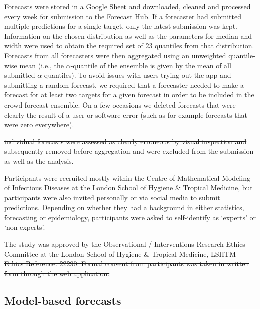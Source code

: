 \documentclass[10pt,letterpaper]{article}
\providecommand{\DIFdeltex}[1]{{\protect\color{red}\sout{#1}}}                      %
\providecommand{\DIFdelbegin}{} %
\providecommand{\DIFdelend}{} %
\providecommand{\DIFdel}[1]{\texorpdfstring{\DIFdeltex{#1}}{}} %
\newcommand{\DIFscaledelfig}{0.5}
\newlength{\DIFdelgraphicswidth} %
\newlength{\DIFdelgraphicsheight} %
\newcommand{\DIFdelincludegraphics}[2][]{%
\sbox{\DIFdelgraphicsbox}{\DIFOincludegraphics[#1]{#2}}%
\settoboxwidth{\DIFdelgraphicswidth}{\DIFdelgraphicsbox} %
\settoboxtotalheight{\DIFdelgraphicsheight}{\DIFdelgraphicsbox} %
\scalebox{\DIFscaledelfig}{%
\parbox[b]{\DIFdelgraphicswidth}{\usebox{\DIFdelgraphicsbox}\\[-\baselineskip] \rule{\DIFdelgraphicswidth}{0em}}\llap{\resizebox{\DIFdelgraphicswidth}{\DIFdelgraphicsheight}{%
\setlength{\unitlength}{\DIFdelgraphicswidth}%
\begin{picture}(1,1)%
\thicklines\linethickness{2pt} %
{\color[rgb]{1,0,0}\put(0,0){\framebox(1,1){}}}%
{\color[rgb]{1,0,0}\put(0,0){\line( 1,1){1}}}%
{\color[rgb]{1,0,0}\put(0,1){\line(1,-1){1}}}%
\end{picture}%
}\hspace*{3pt}}} %
} %
\DeclareRobustCommand{\DIFdelbegin}{\DIFOdelbegin \let\includegraphics\DIFdelincludegraphics} %
\DeclareRobustCommand{\DIFdelend}{\DIFOaddend \let\includegraphics\DIFOincludegraphics} %
\begin{document}
Forecasts were stored in a Google Sheet and downloaded, cleaned and
processed every week for submission to the Forecast Hub. If a forecaster
had submitted multiple predictions for a single target, only the latest
submission was kept. Information on the chosen distribution as well as
the parameters for median and width were used to obtain the required set
of 23 quantiles from that distribution. Forecasts from all forecasters
were then aggregated using an unweighted quantile-wise mean (i.e., the
\(\alpha\)-quantile of the ensemble is given by the mean of all
submitted \(\alpha\)-quantiles). To avoid issues with users trying out
the app and submitting a random forecast, we required that a forecaster
needed to make a forecast for at least two targets for a given forecast
in order to be included in the crowd forecast ensemble. On a few
occasions we deleted forecasts that were clearly the result of a user or
software error (such as for example forecasts that were zero
everywhere).

\DIFdelbegin \DIFdel{individual forecasts were assessed as clearly erroneous by visual
inspection and subsequently removed before aggregation and were excluded
from the submission as well as the analysis.
}%

\DIFdelend Participants were recruited mostly within the Centre of Mathematical
Modeling of Infectious Diseases at the London School of Hygiene \&
Tropical Medicine, but participants were also invited personally or via
social media to submit predictions. Depending on whether they had a
background in either statistics, forecasting or epidemiology,
participants were asked to self-identify as `experts' or `non-experts'.

\DIFdelbegin \DIFdel{The study was approved by the Observational / Interventions Research
Ethics Committee at the London School of Hygiene \& Tropical Medicine,
LSHTM Ethics Reference: 22290. Formal consent from participants was
taken in written form through the web application.
}%

\DIFdelend \hypertarget{model-based-forecasts}{%
\subsection{Model-based forecasts}\label{model-based-forecasts}}
\end{document}
